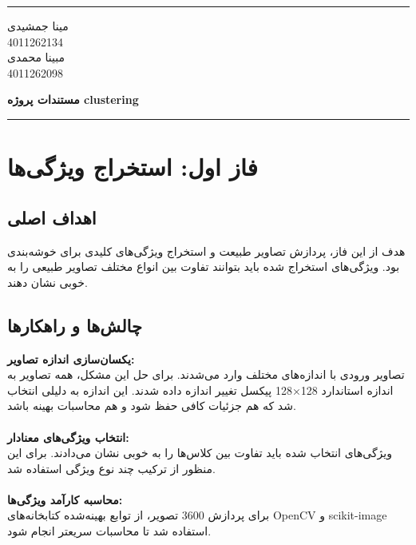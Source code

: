 \documentclass[a4paper,12pt]{article}
\newcommand{\StudentOne}{4011262134}
\newcommand{\StudentTwo}{4011262098}
\newcommand{\NameOne}{مینا جمشیدی}
\newcommand{\NameTwo}{مبینا محمدی}
\newcommand{\ProjectName}{مستندات پروژه clustering}
\let\nobreaksection\section
\renewcommand{\section}{\nobreaksection}
\begin{document}
	

	\hrule \medskip
	\begin{minipage}{0.3\textwidth}
		\raggedright
		\small
		\NameOne \\
		\StudentOne \\
		\NameTwo \\
		\StudentTwo
	\end{minipage}
	\begin{minipage}{0.4\textwidth} 
		\centering 
		\large\bfseries
		\ProjectName \\
	\end{minipage}
	\begin{minipage}{0.3\textwidth}
		\raggedleft
		\small
	\end{minipage}
	\medskip\hrule 
	\vspace*{1.5cm}  
	

\section{فاز اول: استخراج ویژگی‌ها}

\subsection*{\textbf{اهداف اصلی}}
هدف از این فاز، پردازش تصاویر طبیعت و استخراج ویژگی‌های کلیدی برای خوشه‌بندی بود. ویژگی‌های استخراج شده باید بتوانند تفاوت بین انواع مختلف تصاویر طبیعی را به خوبی نشان دهند.

\subsection*{\textbf{چالش‌ها و راهکارها}}

\textbf{یکسان‌سازی اندازه تصاویر:}\\
تصاویر ورودی با اندازه‌های مختلف وارد می‌شدند. برای حل این مشکل، همه تصاویر به اندازه استاندارد 128×128 پیکسل تغییر اندازه داده شدند. این اندازه به دلیلی انتخاب شد که هم جزئیات کافی حفظ شود و هم محاسبات بهینه باشد.
\\
\\
\textbf{انتخاب ویژگی‌های معنادار:}\\
ویژگی‌های انتخاب شده باید تفاوت بین کلاس‌ها را به خوبی نشان می‌دادند. برای این منظور از ترکیب چند نوع ویژگی استفاده شد.
\\
\\
\textbf{محاسبه کارآمد ویژگی‌ها:}\\
برای پردازش 3600 تصویر، از توابع بهینه‌شده کتابخانه‌های OpenCV و scikit-image استفاده شد تا محاسبات سریعتر انجام شود.
\end{document}
